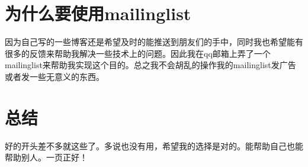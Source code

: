 \documentclass[twoside]{article}
\begin{document}
\begin{CJK*}{UTF8}{gbsn}
\begin{multicols}{2}
\section{为什么要使用mailinglist}

因为自己写的一些博客还是希望及时的能推送到朋友们的手中，同时我也希望能有很多的反馈来帮助我解决一些技术上的问题。因此我在qq邮箱上弄了一个mailinglist来帮助我实现这个目的。总之我不会胡乱的操作我的mailinglist发广告或者发一些无意义的东西。

\section{总结}

好的开头差不多就这些了。多说也没有用，希望我的选择是对的。能帮助自己也能帮助别人。一页正好！

\end{multicols}

\end{CJK*}
\end{document}
